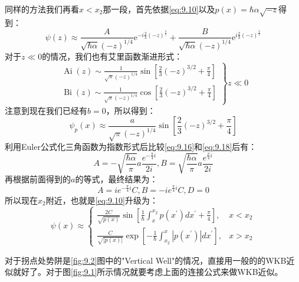 \documentclass[a4paper,zihao=-4,linespread=1]{ctexrep}
\begin{document}
    同样的方法我们再看$x<x_2$那一段，首先依据\ref{eq:9.10}以及$p(x)=\hbar\alpha\sqrt{-z}$得到：
    \begin{equation}
        \label{eq:9.16}
        \psi(z)\approx\frac{A}{\sqrt{\hbar\alpha}(-z)^{1/4}}\mathrm{e}^{-i\frac{2}{3}(-z)^\frac{3}{2}}+\frac{B}{\sqrt{\hbar\alpha}(-z)^{1/4}}\mathrm{e}^{i\frac{2}{3}(-z)^\frac{3}{2}}
    \end{equation}
    对于$z\ll 0$的情况，我们也有艾里函数渐进形式：
    \begin{equation}
        \left.\begin{array}{l}
            \operatorname{Ai}(z) \sim \frac{1}{\sqrt{\pi}(-z)^{1 / 4}} \sin \left[\frac{2}{3}(-z)^{3 / 2}+\frac{\pi}{4}\right] \\
            \operatorname{Bi}(z) \sim \frac{1}{\sqrt{\pi}(-z)^{1 / 4}} \cos \left[\frac{2}{3}(-z)^{3 / 2}+\frac{\pi}{4}\right]
            \end{array}\right\} z \ll 0
    \end{equation}
    注意到现在我们已经有$b=0$，所以得到：
    \begin{equation}
        \label{eq:9.18}
        \psi_{p}(x) \approx \frac{a}{\sqrt{\pi}(-z)^{1 / 4}} \sin \left[\frac{2}{3}(-z)^{3 / 2}+\frac{\pi}{4}\right]
    \end{equation}
    利用Euler公式化三角函数为指数形式后比较\ref{eq:9.16}和\ref{eq:9.18}后有：
    \[A=-\sqrt{\frac{\hbar\alpha}{\pi}}a\frac{e^{-\frac{\pi}{4}i}}{2i},B=\sqrt{\frac{\hbar\alpha}{\pi}}a\frac{e^{\frac{\pi}{4}i}}{2i}\]
    再根据前面得到的$a$的等式，最终结果为：
    \begin{equation}
        A=ie^{-\frac{\pi}{4}i}C,B=-ie^{\frac{\pi}{4}i}C,D=0
    \end{equation}
    所以现在$x_2$附近，也就是\ref{eq:9.10}升级为：
    \begin{equation}
        \label{eq:9.20}
        \psi(x) \approx\left\{\begin{array}{ll}
            \frac{2 C}{\sqrt{p(x)}} \sin \left[\frac{1}{\hbar} \int_{x}^{x_{2}} p\left(x^{\prime}\right) d x^{\prime}+\frac{\pi}{4}\right], & x<x_{2} \\
            \frac{C}{\sqrt{|p(x)|}} \exp \left[-\frac{1}{\hbar} \int_{x_{2}}^{x}\left|p\left(x^{\prime}\right)\right| d x^{\prime}\right], & x>x_{2}
            \end{array}\right.
    \end{equation}
    
    对于拐点处势阱是\ref{fig:9.2}图中的"Vertical Well"的情况，直接用一般的的WKB近似就好了。对于图\ref{fig:9.1}所示情况就要考虑上面的连接公式来做WKB近似。
    
\end{document}
